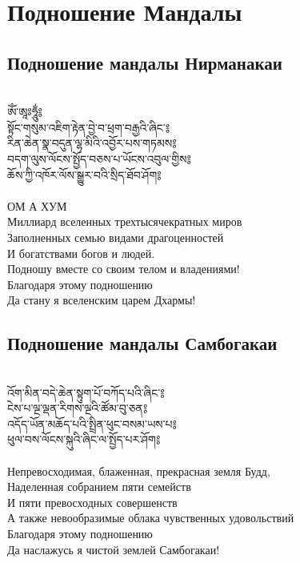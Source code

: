 \section{Подношение Мандалы}

\subsection{Подношение мандалы Нирманакаи}
\\
\ti
ཨོཾ་ཨཱཿཧཱུྂ༔ \\
སྟོང་གསུམ་འཇིག་རྟེན་བྱེ་བ་ཕྲག་བརྒྱའི་ཞིང་༔\\
རིན་ཆེན་སྣ་བདུན་ལྷ་མིའི་འབྱོར་པས་གཏམས༔ \\
བདག་ལུས་ལོངས་སྤྱོད་བཅས་པ་ཡོངས་འབུལ་གྱིས༔ \\
ཆོས་ཀྱི་འཁོར་ལོས་སྒྱུར་བའི་སྲིད་ཐོབ་ཤོག༔ \\
\\
\ru
ОМ А ХУМ\\
Миллиард вселенных трехтысячекратных миров\\
Заполненных семью видами драгоценностей\\
И богатствами богов и людей.\\
Подношу вместе со своим телом и владениями!\\
Благодаря этому подношению\\
Да стану я вселенским царем Дхармы!\\

\subsection{Подношение мандалы Самбогакаи}
\\
\ti
འོག་མིན་བདེ་ཆེན་སྟུག་པོ་བཀོད་པའི་ཞིང་༔ \\
ངེས་པ་ལྔ་ལྡན་རིགས་ལྔའི་ཚོམ་བུ་ཅན༔  \\
འདོད་ཡོན་མཆོད་པའི་སྤྲིན་ཕུང་བསམ་ཡས་པ༔ \\
ཕུལ་བས་ལོངས་སྐུའི་ཞིང་ལ་སྤྱོད་པར་ཤོག༔ \\
\\
\ru
Непревосходимая, блаженная, прекрасная земля Будд,\\
Наделенная собранием пяти семейств\\
И пяти превосходных совершенств\\
А также невообразимые облака чувственных удовольствий\\
Благодаря этому подношению\\
Да наслажусь я чистой землей Самбогакаи!

\newpage
